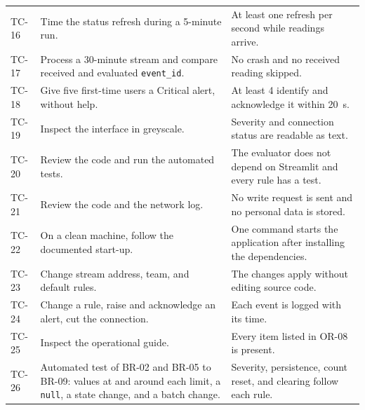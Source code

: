 \documentclass[10pt,a4paper]{article}
\newcommand{\field}[1]{\texttt{#1}}
\begin{document}
{\begin{longtable}{@{}L{14mm}L{67mm}L{72mm}@{}}
TC-16 & Time the status refresh during a 5-minute run. & At least one refresh per second while readings arrive.\\
TC-17 & Process a 30-minute stream and compare received and evaluated \field{event\_id}. & No crash and no received reading skipped.\\
TC-18 & Give five first-time users a Critical alert, without help. & At least 4 identify and acknowledge it within 20~s.\\
TC-19 & Inspect the interface in greyscale. & Severity and connection status are readable as text.\\
TC-20 & Review the code and run the automated tests. & The evaluator does not depend on Streamlit and every rule has a test.\\
TC-21 & Review the code and the network log. & No write request is sent and no personal data is stored.\\
TC-22 & On a clean machine, follow the documented start-up. & One command starts the application after installing the dependencies.\\
TC-23 & Change stream address, team, and default rules. & The changes apply without editing source code.\\
TC-24 & Change a rule, raise and acknowledge an alert, cut the connection. & Each event is logged with its time.\\
TC-25 & Inspect the operational guide. & Every item listed in OR-08 is present.\\
TC-26 & Automated test of BR-02 and BR-05 to BR-09: values at and around each limit, a \field{null}, a state change, and a batch change. & Severity, persistence, count reset, and clearing follow each rule.\\
\bottomrule
\end{longtable}}
\end{document}
